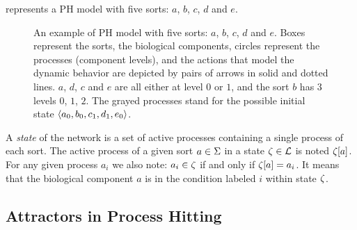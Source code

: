 \begin{example}
 represents a PH model with five sorts: $a$, $b$, $c$, $d$ and $e$.
\begin{figure}[!h]
  \centering
  \caption{\label{fig:ph}
An example of PH model with five sorts: $a$, $b$, $c$, $d$ and $e$. Boxes represent the sorts, the biological components, circles represent the processes (component levels), and the actions that model the dynamic behavior are depicted by pairs of arrows in solid and dotted lines. $a$, $d$, $c$ and $e$ are all either at level $0$ or $1$, and the sort $b$ has $3$ levels $0$, $1$, $2$. The grayed processes stand for the possible initial state $\mbox{$\langle a_0, b_0, c_1, d_1, e_0 \rangle$}$.
  }
\end{figure}

\end{example}

A \emph{state} of the network is a set of active processes containing a single process of each sort.
The active process of a given sort $a \in \Sigma$ in a state $\zeta \in \mathcal{L}$
is noted ${\zeta[a]}$.
For any given process $a_i$ we also note: $a_i \in \zeta$ if and only if ${\zeta[a]} = a_i$. It means that the biological component $a$ is in the condition labeled $i$ within state $\zeta$.

\subsection{Attractors in Process Hitting}

